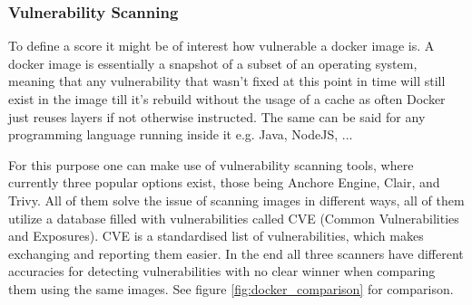 \subsubsection{Vulnerability Scanning}
To define a score it might be of interest how vulnerable a docker image is. A docker image is essentially a snapshot of a subset of an operating system, meaning that any vulnerability that wasn't fixed at this point in time will still exist in the image till it's rebuild without the usage of a cache as often Docker just reuses layers if not otherwise instructed. The same can be said for any programming language running inside it e.g. Java, NodeJS, ...

For this purpose one can make use of vulnerability scanning tools, where currently three popular options exist, those being Anchore Engine, Clair, and Trivy.
All of them solve the issue of scanning images in different ways, all of them utilize a database filled with vulnerabilities called CVE (Common Vulnerabilities and Exposures). CVE is a standardised list of vulnerabilities, which makes exchanging and reporting them easier.
In the end all three scanners have different accuracies for detecting vulnerabilities with no clear winner when comparing them using the same images. See figure \ref{fig:docker_comparison} for comparison.

